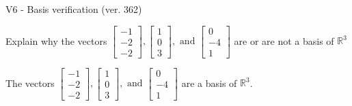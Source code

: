 \begin{exercise}
  \begin{exerciseTitle}V6 - Basis verification (ver. 362)\end{exerciseTitle}
  \begin{exerciseStatement}
    Explain why the vectors \(\left[\begin{array}{r}
-1 \\
-2 \\
-2
\end{array}\right] , \left[\begin{array}{r}
1 \\
0 \\
3
\end{array}\right] , \text{ and } \left[\begin{array}{r}
0 \\
-4 \\
1
\end{array}\right]\) are or are not a basis of \(\mathbb{R}^3\)	


  \end{exerciseStatement}
  \begin{exerciseAnswer}
   The vectors \(\left[\begin{array}{r}
-1 \\
-2 \\
-2
\end{array}\right] , \left[\begin{array}{r}
1 \\
0 \\
3
\end{array}\right] , \text{ and } \left[\begin{array}{r}
0 \\
-4 \\
1
\end{array}\right]\) 
  	 are  a basis of \(\mathbb{R}^3\).
  


  \end{exerciseAnswer}
\end{exercise}